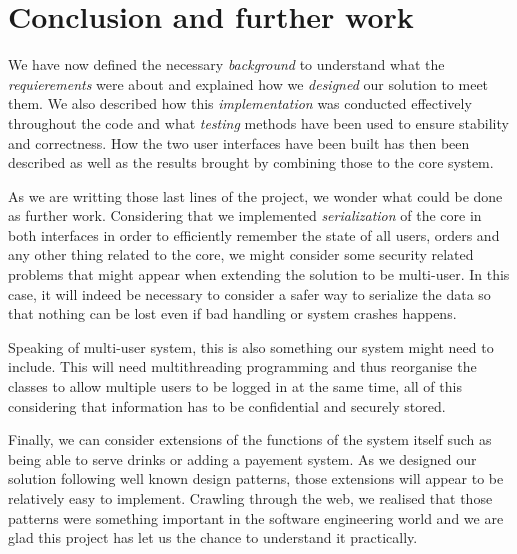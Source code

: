 \section{Conclusion and further work} %
\label{sec:conclusion}
We have now defined the necessary \emph{background} to understand
what the \emph{requierements} were about and explained how we \emph{designed} 
our solution to meet them. We also described how this 
\emph{implementation} was conducted effectively throughout the code
and what \emph{testing} methods have been used to ensure stability
and correctness.
How the two user interfaces have been built has then been described
as well as the results brought by combining those to the core system.

As we are writting those last lines of the project, we wonder what
could be done as further work.
Considering that we implemented \emph{serialization} of the core
in both interfaces in order to efficiently remember the state
of all users, orders and any other thing related to the core,
we might consider some security related problems that might
appear when extending the solution to be multi-user.
In this case, it will indeed be necessary to consider a safer
way to serialize the data so that nothing can be lost even
if bad handling or system crashes happens.

Speaking of multi-user system, this is also something our system
might need to include.
This will need multithreading programming and thus reorganise
the classes to allow multiple users to be logged in at the same
time, all of this considering that information has to be
confidential and securely stored. 

Finally, we can consider extensions of the functions of the system itself
such as being able to serve drinks or adding a payement system.
As we designed our solution following well known design patterns,
those extensions will appear to be relatively easy to implement.
Crawling through the web, we realised that those patterns were something
important in the software engineering world and we are glad this
project has let us the chance to understand it practically.

